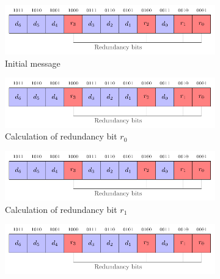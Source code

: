 \begin{figure}[ht]
    \centering
    \begin{subfigure}[b]{0.49\textwidth}
        \includegraphics[width=\textwidth, page=2]{c5_countermeasures_dift/img/hamming_bit.pdf}
        \caption{Initial message}
        \label{fig:hamming_code_example_1}
    \end{subfigure}
    \hfill
    \begin{subfigure}[b]{0.49\textwidth}
        \includegraphics[width=\textwidth, page=4]{c5_countermeasures_dift/img/hamming_bit.pdf}
        \caption{Calculation of redundancy bit $r_0$}
        \label{fig:hamming_code_example_2}
    \end{subfigure}
    \hfill
    \begin{subfigure}[b]{0.49\textwidth}
        \includegraphics[width=\textwidth, page=6]{c5_countermeasures_dift/img/hamming_bit.pdf}
        \caption{Calculation of redundancy bit $r_1$}
        \label{fig:hamming_code_example_3}
    \end{subfigure}
    \hfill
    \begin{subfigure}[b]{0.49\textwidth}
        \includegraphics[width=\textwidth, page=8]{c5_countermeasures_dift/img/hamming_bit.pdf}

\end{subfigure}
\end{figure}

